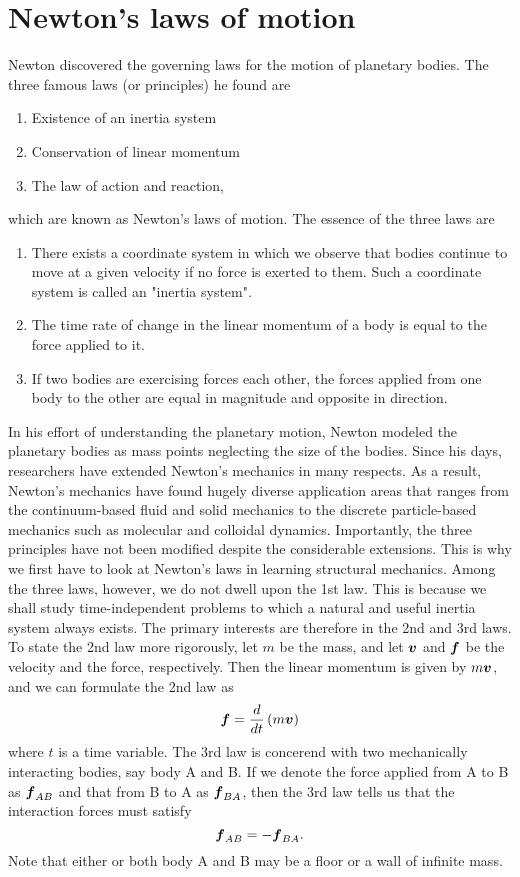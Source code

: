 \documentclass[10pt,a4j]{article}
\begin{document}
\section{Newton's laws of motion}
Newton discovered the governing laws for the motion of planetary bodies. The three famous laws (or principles) he found are  
\begin{enumerate}
    \item Existence of an inertia system
    \item Conservation of linear momentum
    \item The law of action and reaction,
\end{enumerate}
which are known as Newton's laws of motion. The essence of the three laws are
\begin{enumerate}
\item 
    There exists a coordinate system in which we observe that bodies continue to move at a given velocity if no force is exerted to them. Such a coordinate system is called an "inertia system".
\item
    The time rate of change in the linear momentum of a body is equal to the force applied to it.
\item
    If two bodies are exercising forces each other, the forces applied from one body to the other are equal in magnitude and opposite in direction.
\end{enumerate}
In his effort of understanding the planetary motion, Newton modeled the planetary bodies as mass points neglecting the size of the bodies. Since his days, researchers have extended Newton's mechanics in many respects. 
As a result, Newton's mechanics have found hugely diverse application areas that ranges 
from the continuum-based fluid and solid mechanics to the discrete particle-based mechanics 
such as molecular and colloidal dynamics. Importantly, the three principles have not been 
modified despite the considerable extensions. This is why we first have to look at 
Newton's laws in learning structural mechanics.
Among the three laws, however, we do not dwell upon the 1st law. 
This is because we shall study time-independent problems to which a natural and useful inertia system always exists. 
The primary interests are therefore in the 2nd and 3rd laws. To state the 2nd law more rigorously, let $m$ be the mass, and let $\mbox{\boldmath $v$}$ and $\mbox{\boldmath $f$}$ be the velocity and the force, respectively. Then the linear momentum is given by $m\mbox{\boldmath $v$}$, and we can formulate the 2nd law as 
\begin{equation}
    \mbox{\boldmath $f$}=\frac{d}{dt}\left(m\mbox{\boldmath $v$}\right)
    \label{eqn:2nd_law}
\end{equation}
where $t$ is a time variable. The 3rd law is concerend with two mechanically interacting bodies, say body A and B. If we denote the force applied from A to B as $\mbox{\boldmath $f$}_{AB}$ and that from B to A as $\mbox{\boldmath $f$}_{BA}$, then the 3rd law tells us that the interaction forces must satisfy  
\begin{equation}
    \mbox{\boldmath $f$}_{AB}=-\mbox{\boldmath $f$}_{BA}.
    \label{eqn:3rd_law}
\end{equation}
Note that either or both body A and B may be a floor or a wall of infinite mass. 
\end{document}
